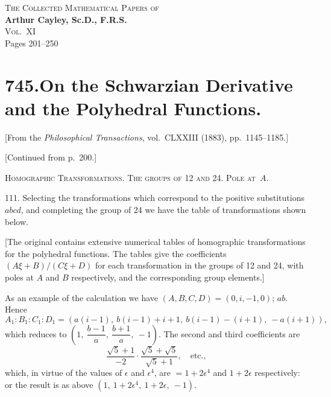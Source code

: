 \documentclass[12pt,a4paper]{article}
\begin{document}
\begin{center}
  \LARGE\textsc{The Collected Mathematical Papers of}\\[0.5em]
  \LARGE\textbf{Arthur Cayley, Sc.D., F.R.S.}\\[1em]
  \Large\textsc{Vol.~XI}\\[2em]
  \large Pages 201--250
\end{center}

\vspace{2em}


\newpage
\section*{\textbf{745.}\quad On the Schwarzian Derivative and the Polyhedral Functions.}

[From the \textit{Philosophical Transactions}, vol.~CLXXIII (1883), pp.~1145--1185.]

[Continued from p.~200.]

\medskip

\noindent\textsc{Homographic Transformations. The groups of 12 and 24. Pole at~$A$.}

111. Selecting the transformations which correspond to the positive substitutions $abcd$, and completing the group of 24 we have the table of transformations shown below.

[The original contains extensive numerical tables of homographic transformations for the polyhedral functions. The tables give the coefficients $(A\xi + B)/(C\xi + D)$ for each transformation in the groups of 12 and 24, with poles at $A$ and $B$ respectively, and the corresponding group elements.]

As an example of the calculation we have $(A, B, C, D) = (0, i, -1, 0)$; $ab$. Hence
\[
A_1 : B_1 : C_1 : D_1 = (a(i-1),\ b(i-1)+i+1,\ b(i-1)-(i+1),\ -a(i+1)),
\]
which reduces to $(1,\ \dfrac{b-1}{a},\ \dfrac{b+1}{a},\ -1)$. The second and third coefficients are
\[
\frac{\sqrt{5}+1}{-2} \cdot \frac{\sqrt{5}+\sqrt{5}}{\sqrt{5}+1}, \quad \text{etc.},
\]
which, in virtue of the values of $\epsilon$ and $\epsilon^4$, are $= 1+2\epsilon^4$ and $1+2\epsilon$ respectively: or the result is as above $(1,\ 1+2\epsilon^4,\ 1+2\epsilon,\ -1)$.

\medskip
\end{document}
